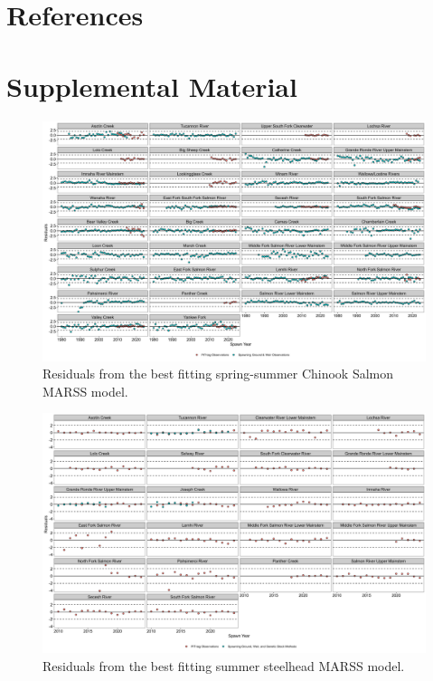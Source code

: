 \documentclass[10pt,a4paper]{article}
\begin{document}
\newpage

\section{References}\label{references}

\section{Supplemental Material}\label{supplemental-material}

\begin{figure}[htbp]
\includegraphics[width=1\linewidth]{../figures/Chinook_salmon/Chinook_salmon_residuals_2024} \caption{Residuals from the best fitting spring-summer Chinook Salmon MARSS model.}\label{fig:chn-resids}
\end{figure}

\begin{figure}[htbp]
\includegraphics[width=1\linewidth]{../figures/Steelhead/Steelhead_residuals_2024} \caption{Residuals from the best fitting summer steelhead MARSS model.}\label{fig:sth-resids}
\end{figure}

\printbibliography
\end{document}
